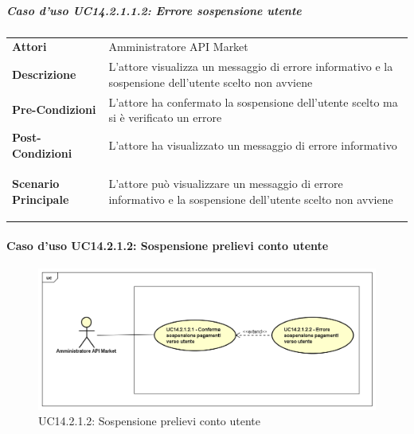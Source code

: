 \subparagraph{Caso d'uso UC14.2.1.1.2: Errore sospensione utente}
\label{UC14_2_1_1_2}

\begin{minipage}{\linewidth}
	\begin{tabular}{ l | p{11cm}}
		\hline
		\rowcolor{Gray}
		\multicolumn{2}{c}{UC14.2.1.1.2 - Errore sospensione utente} \\
		\hline
		\textbf{Attori} & Amministratore API Market \\
		\textbf{Descrizione} & L'attore visualizza un messaggio di errore informativo e la sospensione dell'utente scelto non avviene \\
		\textbf{Pre-Condizioni} & L'attore ha confermato la sospensione dell'utente scelto ma si è verificato un errore \\
		\textbf{Post-Condizioni} & L'attore ha visualizzato un messaggio di errore informativo \\
		\textbf{Scenario Principale} & 
		\begin{enumerate*}[label=(\arabic*.),itemjoin={\newline}]
			\item L'attore può visualizzare un messaggio di errore informativo e la sospensione dell'utente scelto non avviene
		\end{enumerate*}\\
	\end{tabular}
\end{minipage}

\newpage
\paragraph{Caso d'uso UC14.2.1.2: Sospensione prelievi conto utente}
\label{UC14_2_1_2}
\begin{figure}[ht]
	\centering
	\includegraphics[scale=0.45]{UML/UC14_2_1_2.png}
	\caption{UC14.2.1.2: Sospensione prelievi conto utente}
\end{figure}


